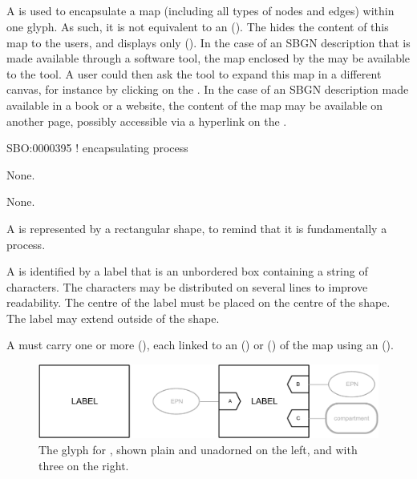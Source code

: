 \subsection{}\label{sec:submap}

A  is used to encapsulate a map (including all types of nodes and edges) within one glyph.
As such, it is not equivalent to an  ().
The  hides the content of this map to the users, and displays only  ().
In the case of an SBGN description that is made available through a software tool, the map enclosed by the   may be available to the tool.
A user could then ask the tool to expand this map in a different canvas, for instance by clicking on the .
In the case of an SBGN description made available in a book or a website, the content of the map may be available on another page, possibly accessible via a hyperlink on the .

\begin{glyphDescription}

\glyphSboTerm
SBO:0000395 ! encapsulating process

\glyphIncoming
None.

\glyphOutgoing
None.

\glyphContainer
A  is represented by a rectangular shape, to remind that it is fundamentally a process.

\glyphLabel
A  is identified by a label that is an unbordered box containing a string of characters.
The characters may be distributed on several lines to improve readability.
The centre of the label must be placed on the centre of the shape.
The label may extend outside of the shape.

\glyphAux
A  must carry one or more  (), each linked to an  () or  () of the map using an  ().

\end{glyphDescription}

\begin{figure}
\begin{center}
\includegraphics[scale=0.7]{images/build/submap.pdf}
\caption{The \PD glyph for , shown plain and unadorned on the left, and with three  on the right.}
\label{fig:submap}
\end{center}
\end{figure}

